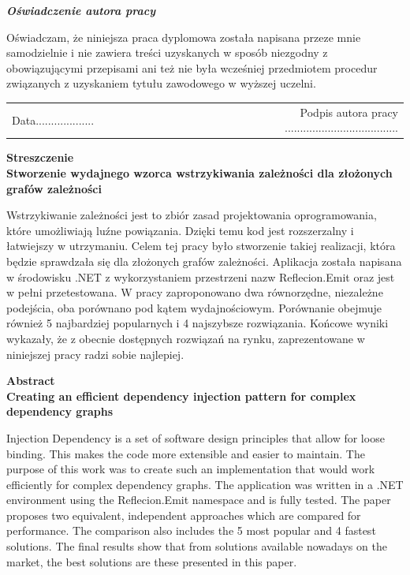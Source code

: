 \documentclass[12pt]{article}
\begin{document}
\vspace{150pt}

\begin{center}
\textbf{\emph{Oświadczenie autora pracy}}\\
\end{center}
Oświadczam, że niniejsza praca dyplomowa została napisana przeze mnie samodzielnie i nie zawiera treści uzyskanych w sposób niezgodny z obowiązującymi przepisami ani też nie była wcześniej przedmiotem procedur związanych z uzyskaniem tytułu zawodowego w wyższej uczelni.\\

\vspace{54pt}

\begin{tabular}{lccccccccr}
Data................... & & & & & & & & & Podpis autora pracy ..................................... \\
\end{tabular}


\clearpage
\begin{center}
\textbf{Streszczenie}\\
\vspace{16pt}
\textbf{Stworzenie wydajnego wzorca wstrzykiwania zależności dla złożonych grafów zależności}
\end{center}
Wstrzykiwanie zależności jest to zbiór zasad projektowania oprogramowania, które umożliwiają luźne powiązania. Dzięki temu kod jest rozszerzalny i łatwiejszy w utrzymaniu. Celem tej pracy było stworzenie takiej realizacji, która będzie sprawdzała się dla złożonych grafów zależności. Aplikacja została napisana w środowisku .NET z wykorzystaniem przestrzeni nazw Reflecion.Emit oraz jest w pełni przetestowana. W pracy zaproponowano dwa równorzędne, niezależne podejścia, oba porównano pod kątem wydajnościowym. Porównanie obejmuje również 5 najbardziej popularnych i 4 najszybsze rozwiązania. Końcowe wyniki wykazały, że z obecnie dostępnych rozwiązań na rynku, zaprezentowane w niniejszej pracy radzi sobie najlepiej.

\clearpage
\begin{center}
\textbf{Abstract}\\
\vspace{16pt}
\textbf{Creating an efficient dependency injection pattern for complex dependency graphs}
\end{center}
Injection Dependency is a set of software design principles that allow for loose binding. This makes the code more extensible and easier to maintain. The purpose of this work was to create such an implementation that would work efficiently for complex dependency graphs. The application was written in a .NET environment using the Reflecion.Emit namespace and is fully tested. The paper proposes two equivalent, independent approaches which are compared for performance. The comparison also includes the 5 most popular and 4 fastest solutions. The final results show that from solutions available nowadays on the market, the best solutions are these presented in this paper.
\end{document}
